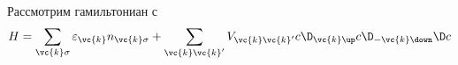 Рассмотрим гамильтониан с 
\begin{equation*}
	H = \sum_{\vc{k} \sigma} \varepsilon_{\vc{k}} n_{\vc{k} \sigma} + \sum_{\vc{k} \vc{k}'} V_{\vc{k} \vc{k}'} c\D_{\vc{k} \up} c\D_{-\vc{k} \down}\D c
\end{equation*}
